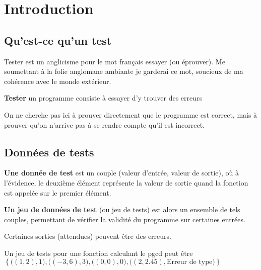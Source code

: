 
\section{Introduction}

\subsection{Qu'est-ce qu'un test}

Tester est un anglicisme pour le mot français essayer (ou éprouver). Me soumettant à la folie anglomane ambiante je garderai ce mot, soucieux de ma cohérence avec le monde extérieur.

\begin{definition}
	\textbf{Tester} un programme consiste à essayer d'y trouver des erreurs
\end{definition}

\begin{rem}
	On ne cherche pas ici à prouver directement que le programme est correct, mais à prouver qu'on n'arrive pas à se rendre compte qu'il est incorrect.
\end{rem}

\subsection{Données de tests}

\begin{definition}
	\textbf{Une donnée de test} est un couple (valeur d'entrée, valeur de sortie), où à l'évidence, le deuxième élément représente la valeur de sortie quand la fonction est appelée sur le premier élément.
\end{definition}

\begin{definition}
	\textbf{Un jeu de données de test} (ou jeu de tests) est alors un ensemble de tels couples, permettant de vérifier la validité du programme sur certaines entrées.
\end{definition}

\begin{rem}
	Certaines sorties (attendues) peuvent être des erreurs.
\end{rem}

\begin{example}
	Un jeu de tests pour une fonction calculant le pgcd peut être \\$\left\{ \big((1,2), 1\big), \big((-3, 6), 3\big), \big((0, 0), 0\big), \big((2, 2.45), \text{Erreur de type}\big) \right\}$
\end{example}

